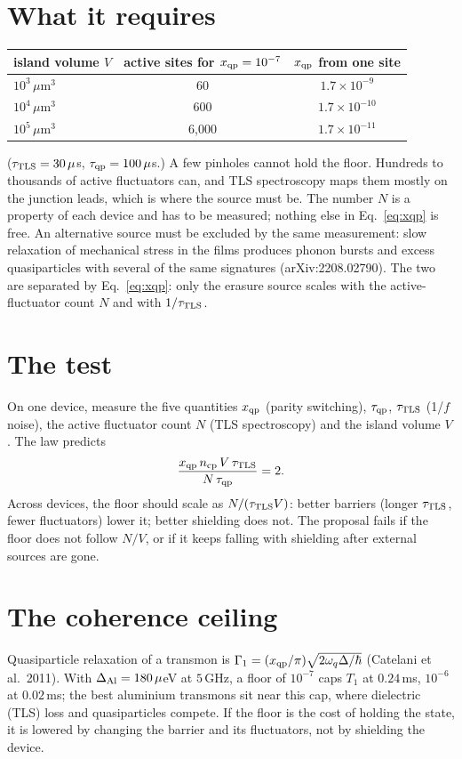 \section{What it requires}
\begin{center}\small\begin{tabular}{lcc}\toprule
island volume $V$ & active sites for $x_{\rm qp}=10^{-7}$ & $x_{\rm qp}$ from one site\\\midrule
$10^3\,\mu$m$^3$ & 60 & $1.7\times10^{-9}$\\ $10^4\,\mu$m$^3$ & 600 & $1.7\times10^{-10}$\\ $10^5\,\mu$m$^3$ & 6{,}000 & $1.7\times10^{-11}$\\\bottomrule
\end{tabular}\end{center}
($\tau_{\rm TLS}=30\,\mu$s, $\tau_{\rm qp}=100\,\mu$s.) A few pinholes cannot hold the floor. Hundreds to thousands of active fluctuators can, and
TLS spectroscopy maps them mostly on the junction leads, which is where the source must be. The number $N$ is a property of each device and has to be
measured; nothing else in Eq.~\eqref{eq:xqp} is free. An alternative source must be excluded by the same measurement: slow relaxation of mechanical stress in the films produces phonon bursts and
excess quasiparticles with several of the same signatures (arXiv:2208.02790). The two are separated by Eq.~\eqref{eq:xqp}: only the erasure source
scales with the active-fluctuator count $N$ and with $1/\tau_{\rm TLS}$.

\section{The test}
On one device, measure the five quantities $x_{\rm qp}$ (parity switching), $\tau_{\rm qp}$, $\tau_{\rm TLS}$ (1/$f$ noise), the active fluctuator count
$N$ (TLS spectroscopy) and the island volume $V$. The law predicts
\begin{equation}\frac{x_{\rm qp}\,n_{\rm cp}\,V\,\tau_{\rm TLS}}{N\,\tau_{\rm qp}}=2.\end{equation}
Across devices, the floor should scale as $N/(\tau_{\rm TLS}V)$: better barriers (longer $\tau_{\rm TLS}$, fewer fluctuators) lower it; better
shielding does not. The proposal fails if the floor does not follow $N/V$, or if it keeps falling with shielding after external sources are gone.

\section{The coherence ceiling}
Quasiparticle relaxation of a transmon is $\Gamma_1=(x_{\rm qp}/\pi)\sqrt{2\omega_q\Delta/\hbar}$ (Catelani et al.\ 2011). With
$\Delta_{\rm Al}=180\,\mu$eV at $5$\,GHz, a floor of $10^{-7}$ caps $T_1$ at $0.24$\,ms, $10^{-6}$ at $0.02$\,ms; the best aluminium transmons sit
near this cap, where dielectric (TLS) loss and quasiparticles compete. If the floor is the cost of holding the state, it is lowered by changing the barrier and its
fluctuators, not by shielding the device.

